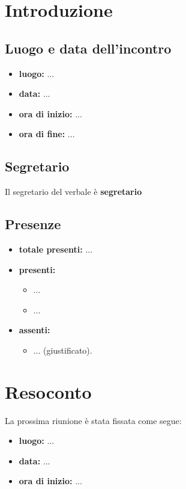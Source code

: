 \section{Introduzione}

\subsection{Luogo e data dell'incontro}
	\begin{itemize}
		\item \textbf{luogo:} ...
		\item \textbf{data:} ...
		\item \textbf{ora di inizio:} ...
		\item \textbf{ora di fine:} ...
	\end{itemize}

\subsection{Segretario}
Il segretario del verbale è \textbf{segretario}

\subsection{Presenze}
	\begin{itemize}
		\item \textbf{totale presenti:} ...
		\item \textbf{presenti: }
			\begin{itemize}			
				\item ...
				\item ...
			\end{itemize}
		\item \textbf{assenti: } 
			\begin{itemize}	
				\item ... (giustificato).
			\end{itemize}
	\end{itemize}


\newpage
\section{Resoconto}
		
La prossima riunione è stata fissata come segue:
\begin{itemize}
	\item \textbf{luogo:} ...
	\item \textbf{data:} ...
	\item \textbf{ora di inizio:} ...
\end{itemize}



